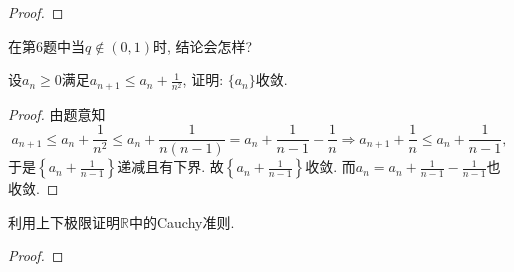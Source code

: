 \begin{quiza}
\begin{proof}
\end{proof}
\woe 在第6题中当\(q\notin (0,1)\)时, 结论会怎样?
\begin{solution}

\end{solution}
\woe 设\(a_{n}\geqslant 0\)满足\( a_{n+1}\leqslant a_n+\frac{1}{n^2}\), 证明: \(\{a_n\}\)收敛.
\begin{proof}
由题意知\[a_{n+1}\leqslant a_n+\frac{1}{n^2}\leqslant a_n+\frac{1}{n(n-1)}=a_{n}+\frac{1}{n-1}-\frac{1}{n}\Rightarrow a_{n+1}+\frac{1}{n}\leqslant a_{n}+\frac{1}{n-1},\]于是\(\left\lbrace a_n+\frac{1}{n-1}\right\rbrace\)递减且有下界. 故\(\left\lbrace a_n+\frac{1}{n-1}\right\rbrace\)收敛. 而\(a_n=a_n+\frac{1}{n-1}-\frac{1}{n-1}\)也收敛.
\end{proof}
\woe 利用上下极限证明\(\mathbb{R}\)中的Cauchy准则.
\begin{proof}

\end{proof}
\end{quiza}
